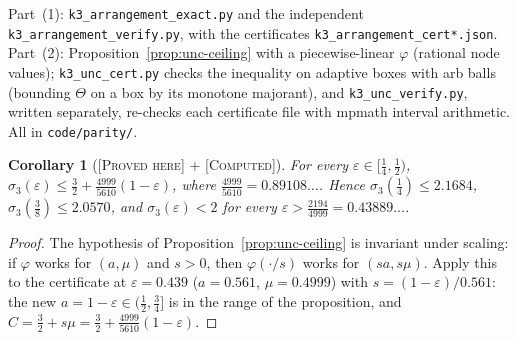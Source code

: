 \documentclass[11pt]{amsart}
\newtheorem{corollary}[theorem]{Corollary}
\theoremstyle{definition}
\theoremstyle{remark}
\newcommand{\lbl}[1]{\textup{\textsc{[#1]}}}
\begin{document}
\begin{sloppypar}
Part~(1): \texttt{k3\_\allowbreak{}arrangement\_\allowbreak{}exact.py} and the independent
\texttt{k3\_\allowbreak{}arrangement\_\allowbreak{}verify.py}, with the certificates
\texttt{k3\_\allowbreak{}arrangement\_\allowbreak{}cert*.json}. Part~(2):
Proposition~\ref{prop:unc-ceiling} with a piecewise-linear $\varphi$ (rational
node values); \texttt{k3\_\allowbreak{}unc\_\allowbreak{}cert.py} checks the inequality on
adaptive boxes with arb balls (bounding $\Theta$ on a box by its monotone
majorant), and \texttt{k3\_\allowbreak{}unc\_\allowbreak{}verify.py}, written separately,
re-checks each certificate file with mpmath interval arithmetic. All in
\texttt{code/}\allowbreak\texttt{parity/}.
\end{sloppypar}

\begin{corollary}[\lbl{Proved here} + \lbl{Computed}]\label{cor:k3-linear}
For every $\varepsilon\in[\frac14,\frac12)$,
$\sigma_3(\varepsilon)\le\frac32+\frac{4999}{5610}(1-\varepsilon)$, where
$\frac{4999}{5610}=0.89108\ldots$. Hence $\sigma_3(\frac14)\le2.1684$,
$\sigma_3(\frac38)\le2.0570$, and $\sigma_3(\varepsilon)<2$ for every
$\varepsilon>\frac{2194}{4999}=0.43889\ldots$.
\end{corollary}

\begin{proof}
The hypothesis of Proposition~\ref{prop:unc-ceiling} is invariant under
scaling: if $\varphi$ works for $(a,\mu)$ and $s>0$, then $\varphi(\cdot/s)$ works
for $(sa,s\mu)$. Apply this to the certificate at $\varepsilon=0.439$ ($a=0.561$,
$\mu=0.4999$) with $s=(1-\varepsilon)/0.561$: the new $a=1-\varepsilon\in(\frac12,\frac34]$ is in the
range of the proposition, and $C=\frac32+s\mu=\frac32+\frac{4999}{5610}(1-\varepsilon)$.
\end{proof}
\end{document}
